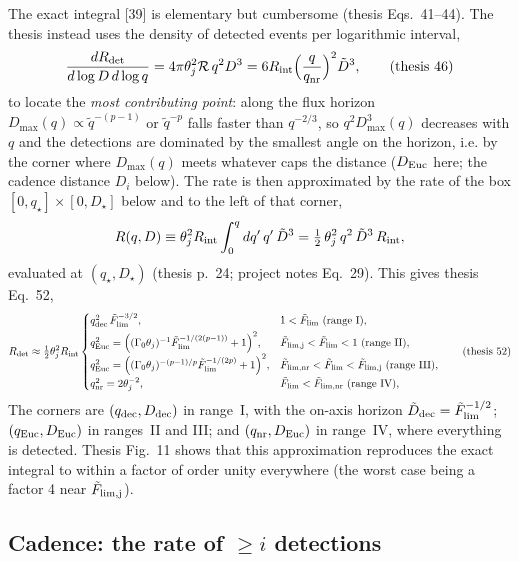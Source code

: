 \documentclass[11pt,a4paper]{article}
\newcommand{\tq}{\tilde{q}}
\newcommand{\tD}{\tilde{D}}
\newcommand{\tF}{\tilde{F}}
\newcommand{\Euc}{{\rm Euc}}
\newcommand{\dec}{{\rm dec}}
\newcommand{\nr}{{\rm nr}}
\newcommand{\tFlim}{\tilde{F}_{\rm lim}}
\newcommand{\Rint}{R_{\rm int}}
\newcommand{\Rdet}{R_{\rm det}}
\begin{document}
The exact integral [39] is elementary but cumbersome (thesis Eqs.~41--44). The thesis instead uses the density of detected events per logarithmic interval,
\begin{equation}
\frac{d\Rdet}{d\log D\,d\log q}=4\pi\theta_j^2\mathcal R\,q^2D^3=6\Rint\Bigl(\frac{q}{q_\nr}\Bigr)^2\tD^3,
\tag{thesis 46}
\end{equation}
to locate the \emph{most contributing point}: along the flux horizon $D_{\max}(q)\propto\tq^{-(p-1)}$ or $\tq^{-p}$ falls faster than $q^{-2/3}$, so $q^2D_{\max}^3(q)$ decreases with $q$ and the detections are dominated by the smallest angle on the horizon, i.e. by the corner where $D_{\max}(q)$ meets whatever caps the distance ($D_\Euc$ here; the cadence distance $D_i$ below). The rate is then approximated by the rate of the box $[0,q_\star]\times[0,D_\star]$ below and to the left of that corner,
\begin{equation}
\label{eq:RqD}
R(q,D)\equiv\theta_j^2\Rint\int_0^{q}dq'\,q'\,\tD^3=\tfrac12\,\theta_j^2\,q^2\,\tD^3\,\Rint ,
\end{equation}
evaluated at $(q_\star,D_\star)$ (thesis p.~24; project notes Eq.~29). This gives thesis Eq.~52,
\begin{equation}
\label{eq:Rdet52}
\Rdet\approx\tfrac12\theta_j^2\Rint\begin{cases}
q_\dec^2\,\tFlim^{-3/2}, & 1<\tFlim\ \text{(range I)},\\[3pt]
q_\Euc^2=\Bigl((\Gamma_0\theta_j)^{-1}\tFlim^{-1/(2(p-1))}+1\Bigr)^2, & \tF_{\rm lim,j}<\tFlim<1\ \text{(range II)},\\[3pt]
q_\Euc^2=\Bigl((\Gamma_0\theta_j)^{-(p-1)/p}\tFlim^{-1/(2p)}+1\Bigr)^2, & \tF_{\rm lim,nr}<\tFlim<\tF_{\rm lim,j}\ \text{(range III)},\\[3pt]
q_\nr^2=2\theta_j^{-2}, & \tFlim<\tF_{\rm lim,nr}\ \text{(range IV)},
\end{cases}
\tag{thesis 52}
\end{equation}
The corners are $(q_\dec,D_\dec)$ in range~I, with the on-axis horizon $\tD_\dec=\tFlim^{-1/2}$; $(q_\Euc,D_\Euc)$ in ranges~II and III; and $(q_\nr,D_\Euc)$ in range~IV, where everything is detected. Thesis Fig.~11 shows that this approximation reproduces the exact integral to within a factor of order unity everywhere (the worst case being a factor 4 near $\tF_{\rm lim,j}$).

\subsection{Cadence: the rate of $\geq i$ detections}
\label{sec:cadence}
\end{document}
